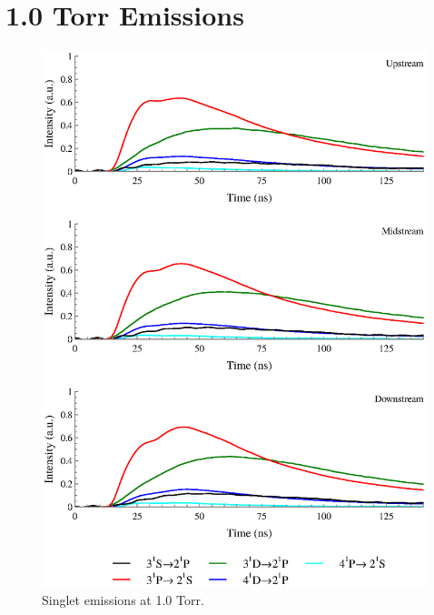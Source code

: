 \section{1.0 Torr Emissions}
\begin{figure}
  \centering
  \includegraphics{./chapters/extraem/figures/1torr_s.eps}
  \caption{Singlet emissions at 1.0 Torr.}
\end{figure}
